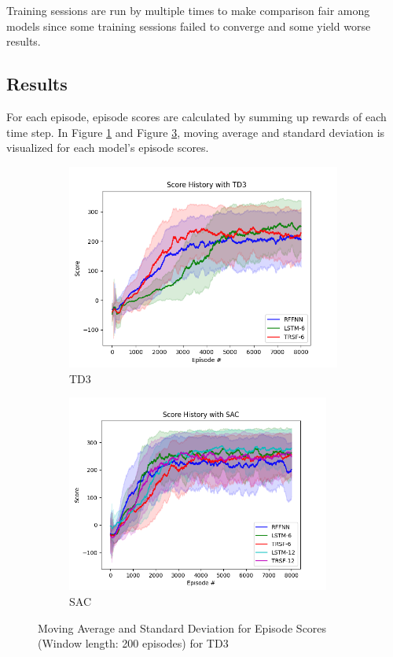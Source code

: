 \documentclass[a4paper, 12pt]{article} %
\begin{document}
Training sessions are run by multiple times to make comparison fair among models since some training sessions failed to converge and some yield worse results.

\subsection{Results}

For each episode, episode scores are calculated by summing up rewards of each time step. 
In Figure \ref{fig:td3_std_ep_rewards} and Figure \ref{fig:sac_std_ep_rewards}, moving average and standard deviation is visualized for each model's episode scores. 

\begin{figure}[!ht]
	\centering
	\begin{subfigure}{.49\textwidth}
		\centering
		\includegraphics[width=0.99\textwidth]{figures/bipedal/STD_TD3_RFFNN_LSTM-6_TRSF-6.png}
		\caption{TD3}
		\label{fig:td3_std_ep_rewards}
	\end{subfigure}
	\begin{subfigure}{.49\textwidth}
		\centering
		\includegraphics[width=0.95\textwidth]{figures/bipedal/STD_SAC_RFFNN_LSTM-6_TRSF-6_LSTM-12_TRSF-12.png}
		\caption{SAC}
		\label{fig:sac_std_ep_rewards}
	\end{subfigure}
	\caption{Moving Average and Standard Deviation for Episode Scores (Window length: 200 episodes) for TD3}
\end{figure}
\end{document}
